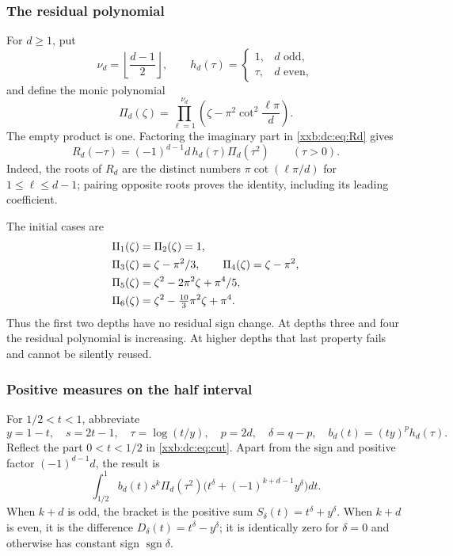 \documentclass[11pt,a4paper]{article}
\numberwithin{equation}{section}
\theoremstyle{definition}
\theoremstyle{remark}
\theoremstyle{plain}
\DeclareMathOperator{\sgn}{sgn}
\begin{document}
\subsubsection{The residual polynomial}
For $d\ge1$, put
\[
 \nu_d=\left\lfloor\frac{d-1}{2}\right\rfloor,\qquad
 h_d(\tau)=\begin{cases}1,&d\text{ odd},\\ \tau,&d\text{ even},\end{cases}
\]
and define the monic polynomial
\begin{equation}\label{xxb:dc:eq:Pd}
 \Pi_d(\zeta)=\prod_{\ell=1}^{\nu_d}\left(\zeta-\pi^2\cot^2\frac{\ell\pi}{d}\right).
\end{equation}
The empty product is one.  Factoring the imaginary part in
\eqref{xxb:dc:eq:Rd} gives
\begin{equation}\label{xxb:dc:eq:Rfactor}
 R_d(-\tau)=(-1)^{d-1}d\,h_d(\tau)\Pi_d(\tau^2)\qquad(\tau>0).
\end{equation}
Indeed, the roots of $R_d$ are the distinct numbers
$\pi\cot(\ell\pi/d)$ for $1\le \ell\le d-1$; pairing opposite roots proves the
identity, including its leading coefficient.

The initial cases are
\begin{align}\label{xxb:dc:eq:Pinitial}
 \Pi_1(\zeta)&=\Pi_2(\zeta)=1,\notag\\
 \Pi_3(\zeta)&=\zeta-\pi^2/3,\qquad \Pi_4(\zeta)=\zeta-\pi^2,\\
 \Pi_5(\zeta)&=\zeta^2-2\pi^2\zeta+\pi^4/5,\notag\\
 \Pi_6(\zeta)&=\zeta^2-\tfrac{10}{3}\pi^2\zeta+\pi^4.\notag
\end{align}
Thus the first two depths have no residual sign change.  At depths three
and four the residual polynomial is increasing.  At higher depths that
last property fails and cannot be silently reused.

\subsubsection{Positive measures on the half interval}
For $1/2<t<1$, abbreviate
\[
 y=1-t,\quad s=2t-1,\quad \tau=\log(t/y),\quad p=2d,\quad
 \delta=q-p,\quad b_d(t)=(ty)^p h_d(\tau).
\]
Reflect the part $0<t<1/2$ in \eqref{xxb:dc:eq:cut}.  Apart from the sign and
positive factor $(-1)^{d-1}d$, the result is
\begin{equation}\label{xxb:dc:eq:fold}
 \int_{1/2}^1 b_d(t)s^k\Pi_d(\tau^2)
 \bigl(t^\delta+(-1)^{k+d-1}y^\delta\bigr)dt.
\end{equation}
When $k+d$ is odd, the bracket is the positive sum
$S_\delta(t)=t^\delta+y^\delta$.  When $k+d$ is even, it is the difference
$D_\delta(t)=t^\delta-y^\delta$; it is identically zero for $\delta=0$ and
otherwise has constant sign $\sgn\delta$.
\end{document}
